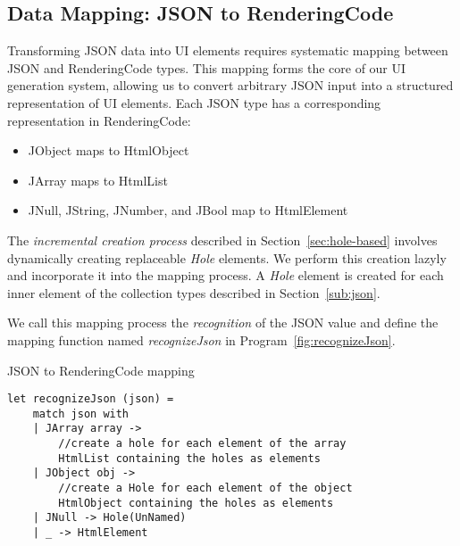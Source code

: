 \subsection{Data Mapping: JSON to RenderingCode}
\label{sec:mapping}
Transforming JSON data into UI elements requires systematic mapping between JSON and RenderingCode types.
This mapping forms the core of our UI generation system, allowing us to convert arbitrary JSON input into a structured representation of UI elements.
Each JSON type has a corresponding representation in RenderingCode:
\begin{itemize}
	\item JObject maps to HtmlObject
	\item JArray maps to HtmlList
	\item JNull, JString, JNumber, and JBool map to HtmlElement
\end{itemize}

The \emph{incremental creation process} described in Section~\ref{sec:hole-based} involves dynamically creating replaceable \emph{Hole} elements.
We perform this creation lazyly and incorporate it into the mapping process.
A \emph{Hole} element is created for each inner element of the collection types described in Section~\ref{sub:json}.


We call this mapping process the \emph{recognition} of the JSON value and define the mapping function named \emph{recognizeJson} in Program~\ref{fig:recognizeJson}.

\begin{listing}[htbp]
	\caption {JSON to RenderingCode mapping}
	\label{fig:recognizeJson}
	\begin{lstlisting}
let recognizeJson (json) =
    match json with
    | JArray array -> 
        //create a hole for each element of the array
        HtmlList containing the holes as elements
    | JObject obj ->
        //create a Hole for each element of the object 
        HtmlObject containing the holes as elements
    | JNull -> Hole(UnNamed)
    | _ -> HtmlElement 
  \end{lstlisting}
\end{listing}

